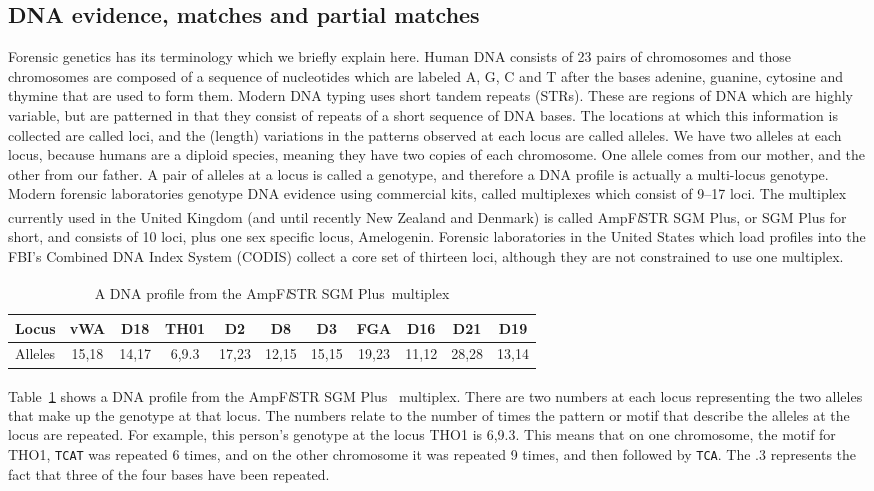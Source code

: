 \documentclass[a4paper,11pt]{article}
\newcommand{\SGMplus}{AmpF\textit{l}STR\textsuperscript{\textregistered}
  SGM Plus\textsuperscript{\texttrademark}}
\begin{document}
\subsection[Matches and partial matches]{DNA evidence, matches and partial matches}
\label{sec:dna-matches-partial}
Forensic genetics has its terminology which we briefly explain here. 
Human DNA consists of 23 pairs of chromosomes and those
chromosomes are composed of a sequence of nucleotides which are
labeled A, G, C and T after the bases adenine, guanine, cytosine and
thymine that are used to form them. Modern DNA typing uses short
tandem repeats (STRs). These are regions of DNA which are highly
variable, but are patterned in that they consist of repeats of a short
sequence of DNA bases. The locations at which this information is
collected are called loci, and the (length) variations in the patterns
observed at each locus are called alleles. We have two alleles at each
locus, because humans are a diploid species, meaning they have two
copies of each chromosome. One allele comes from our mother, and the
other from our father. A pair of alleles at a locus is called a
genotype, and therefore a DNA profile is actually a multi-locus genotype.
Modern forensic laboratories genotype DNA evidence using commercial kits,
called multiplexes which consist of 9--17 loci. The multiplex currently
used in the United Kingdom (and until recently New Zealand and
Denmark) is called \SGMplus, or SGM Plus for short, and consists of 10 loci, plus one sex
specific locus, Amelogenin. Forensic laboratories in the United States
which load profiles into the FBI's Combined DNA Index System (CODIS) collect a
core set of thirteen loci, although they are not constrained to use
one multiplex.

\begin{table}[h]
  \centering
  \begin{tabular}{l*{10}{c}}
    \toprule
    Locus & vWA & D18 & TH01 & D2 & D8 & D3 & FGA & D16 & D21 & D19 \\
    \midrule
    Alleles & 15,18 & 14,17 &  6,9.3 & 17,23 & 12,15 & 15,15 & 19,23 & 11,12 & 28,28
    & 13,14\\
    \bottomrule
  \end{tabular}
  \caption{A DNA profile from the \SGMplus~multiplex}
  \label{tab:prof}
\end{table}

Table~\ref{tab:prof} shows a DNA profile from the \SGMplus~ multiplex.
There are two numbers at each locus representing the two alleles that
make up the genotype at that locus. The numbers relate to the number
of times the pattern or motif that describe the alleles at the locus
are repeated. For example, this person's genotype at the locus THO1 is
6,9.3. This means that on one chromosome, the motif for THO1,
\texttt{TCAT} was repeated 6 times, and on the other chromosome it was
repeated 9 times, and then followed by \texttt{TCA}. The .3 represents
the fact that three of the four bases have been repeated.
\end{document}
